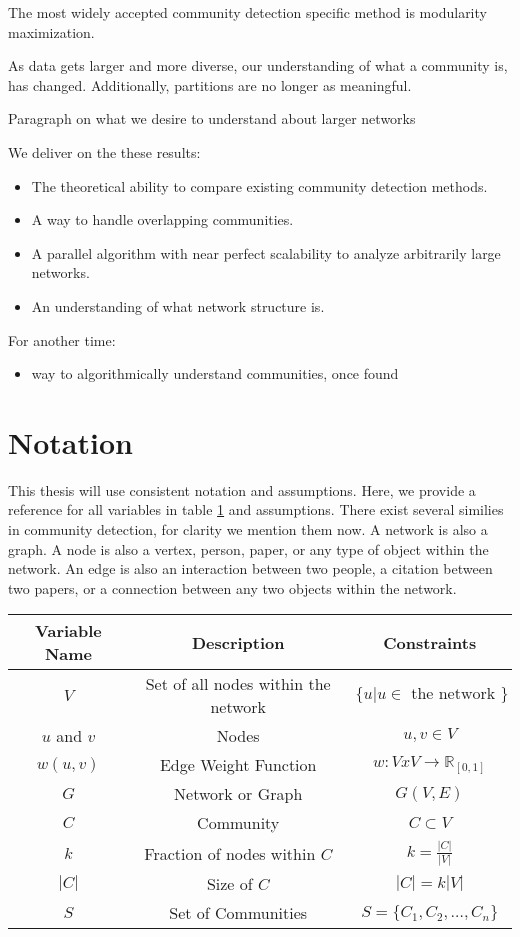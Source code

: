 \documentclass[phd,tocprelim]{cornell}
\renewcommand{\caption}[1]{\singlespacing\hangcaption{#1}\normalspacing}
\begin{document}
The most widely accepted community detection specific method is modularity maximization.

As data gets larger and more diverse, our understanding of what a community is, has changed.  Additionally, partitions are no longer as meaningful.

Paragraph on what we desire to understand about larger networks

We deliver on the these results:
\begin{itemize}
\item The theoretical ability to compare existing community detection methods.
\item A way to handle overlapping communities.
\item A parallel algorithm with near perfect scalability to analyze arbitrarily large networks.
\item An understanding of what network structure is.
\end{itemize}


For another time:
\begin{itemize}
\item way to algorithmically understand communities, once found
\end{itemize}

\section{Notation}

This thesis will use consistent notation and assumptions.  Here, we provide a reference for all variables in table \ref{table_variables} and assumptions.  There exist several similies in community detection, for clarity we mention them now.  A network is also a graph.  A node is also a vertex, person, paper, or any type of object within the network.  An edge is also an interaction between two people, a citation between two papers, or a connection between any two objects within the network.

\begin{table}[ht]
\caption{Notation}
\begin{center}
\begin{tabular}{|c|c|c|} \hline
Variable Name & Description & Constraints \\ \hline
$V$ & Set of all nodes within the network & $\{u | u \in \mbox{ the network }\}$\\ \hline
$u$ and $v$ & Nodes & $u, v \in V$ \\ \hline
$w(u,v)$ & Edge Weight Function &  $w:VxV \rightarrow \mathbb{R} _{[0, 1]}$ \\ \hline
$G$ & Network or Graph & $G(V,E)$ \\ \hline
$C$ & Community & $C \subset V$ \\ \hline
$k$ & Fraction of nodes within $C$ & $k = \frac{|C|}{|V|}$ \\ \hline
$|C|$ & Size of $C$ & $|C| = k|V |$ \\ \hline
$S$ & Set of Communities & $S = \{C_1,C_2,\dots,C_n\}$\\ \hline
\end{tabular}
\end{center}
\label{table_variables}
\end{table}
\end{document}
